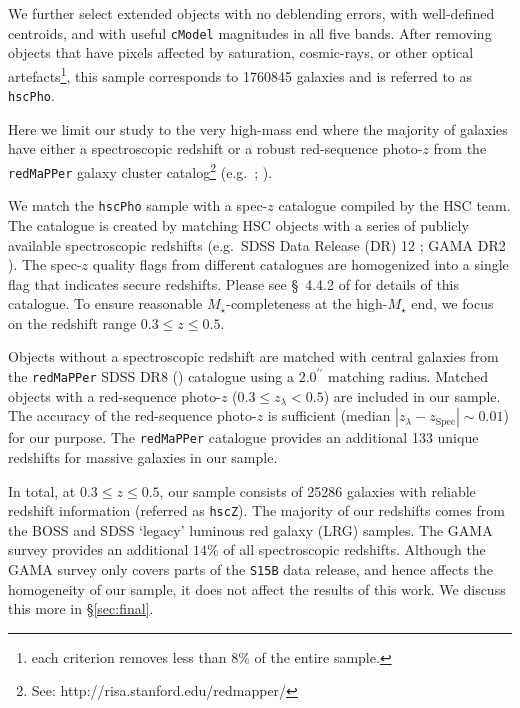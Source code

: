 \documentclass[fleqn,usenatbib]{mnras}
\def\arcsec{{\prime\prime}}
\def\redm{\texttt{redMaPPer}}
\def\mstar{{$M_{\star}$}}
\begin{document}
    We further select extended objects with no deblending errors, with well-defined 
    centroids, and with useful \texttt{cModel} magnitudes in all five bands. 
    After removing objects that have pixels affected by saturation, cosmic-rays, or 
    other optical artefacts\footnote{each criterion removes less than 8\% of the 
    entire sample.}, this sample corresponds to 1760845 galaxies and is  referred to
    as \texttt{hscPho}. 
        
    Here we limit our study to the very high-mass end where the majority of galaxies 
    have either a spectroscopic redshift or a robust red-sequence photo-$z$ from the 
    \redm{} galaxy cluster catalog\footnote{See: http://risa.stanford.edu/redmapper/} 
    (e.g.\ \citealt{Rykoff2014}; \citealt{Rozo2015b}).  

    We match the \texttt{hscPho} sample with a spec-$z$ catalogue compiled by the HSC 
    team.
    The catalogue is created by matching HSC objects with a series of publicly 
    available spectroscopic redshifts (e.g.\ SDSS Data Release (DR) 12  
    \citealt{SDSS-DR12}; GAMA DR2 \citealt{Liske2015}). 
    The spec-$z$ quality flags from different catalogues are homogenized into a single 
    flag that indicates secure redshifts.
    Please see \S~4.4.2 of \citet{HSC-DR1} for details of this catalogue.  
    To ensure reasonable \mstar{}-completeness at the high-\mstar{} end, we focus on
    the redshift range $0.3 \leq z \leq 0.5$. 
   
    Objects without a spectroscopic redshift are matched with central 
    galaxies from the \redm{} SDSS DR8 (\citealt{Rykoff2014}) catalogue using a 
    $2.0^{\arcsec}$ matching radius. 
    Matched objects with a red-sequence photo-$z$ ($0.3 \leq z_{\lambda} < 0.5$) are 
    included in our sample. 
    The accuracy of the red-sequence photo-$z$ is sufficient (median 
    $|z_{\lambda} - z_{\mathrm{Spec}}| {\sim} 0.01$) for our purpose.
    The \redm{} catalogue provides an additional 133 unique redshifts for massive 
    galaxies in our sample.
        
    In total, at $0.3 \leq z \leq 0.5$, our sample consists of 25286 galaxies with 
    reliable redshift information (referred as \texttt{hscZ}).
    The majority of our redshifts comes from the BOSS and SDSS `legacy' luminous 
    red galaxy (LRG) samples. 
    The GAMA survey provides an additional $14$\% of all spectroscopic redshifts.
    Although the GAMA survey only covers parts of the \texttt{S15B} data release, 
    and hence affects the homogeneity of our sample, it does not affect the results 
    of this work.
    We discuss this more in \S \ref{sec:final}.
\end{document}
